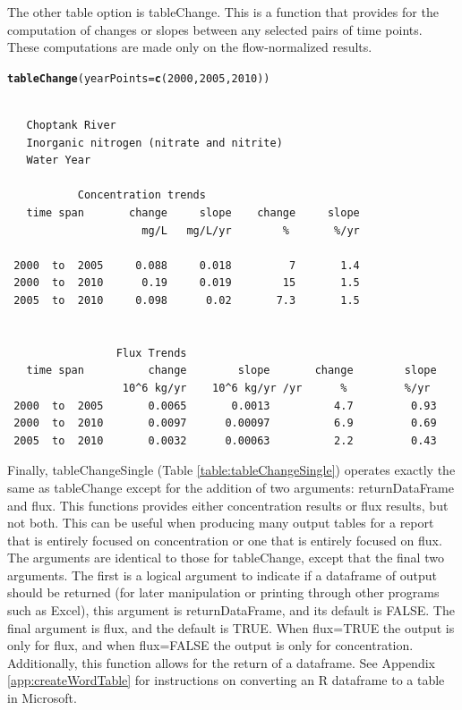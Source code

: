 \documentclass[a4paper,11pt]{article}\usepackage{graphicx, color}
\makeatletter
\newcommand{\hlfunctioncall}[1]{\textcolor[rgb]{0.501960784313725,0,0.329411764705882}{\textbf{#1}}}%
\newenvironment{kframe}{%
 \def\at@end@of@kframe{}%
 \ifinner\ifhmode%
  \def\at@end@of@kframe{\end{minipage}}%
  \begin{minipage}{\columnwidth}%
 \fi\fi%
 \def\FrameCommand##1{\hskip\@totalleftmargin \hskip-\fboxsep
 \colorbox{shadecolor}{##1}\hskip-\fboxsep
     \hskip-\linewidth \hskip-\@totalleftmargin \hskip\columnwidth}%
 \MakeFramed {\advance\hsize-\width
   \@totalleftmargin\z@ \linewidth\hsize
   \@setminipage}}%
 {\par\unskip\endMakeFramed%
 \at@end@of@kframe}
\newenvironment{knitrout}{}{} %
\makeatother
\begin{document}
The other table option is tableChange. This is a function that provides for the computation of changes or slopes between any selected pairs of time points.  These computations are made only on the flow-normalized results.

\begin{knitrout}
\color{fgcolor}\begin{kframe}
\begin{alltt}
\hlfunctioncall{tableChange}(yearPoints=\hlfunctioncall{c}(2000,2005,2010))
\end{alltt}
\begin{verbatim}

   Choptank River 
   Inorganic nitrogen (nitrate and nitrite)
   Water Year 

           Concentration trends
   time span       change     slope    change     slope
                     mg/L   mg/L/yr        %       %/yr

 2000  to  2005     0.088     0.018         7       1.4
 2000  to  2010      0.19     0.019        15       1.5
 2005  to  2010     0.098      0.02       7.3       1.5


                 Flux Trends
   time span          change        slope       change        slope
                  10^6 kg/yr    10^6 kg/yr /yr      %         %/yr
 2000  to  2005       0.0065       0.0013          4.7         0.93
 2000  to  2010       0.0097      0.00097          6.9         0.69
 2005  to  2010       0.0032      0.00063          2.2         0.43
\end{verbatim}
\end{kframe}
\end{knitrout}


Finally, tableChangeSingle (Table \ref{table:tableChangeSingle}) operates exactly the same as tableChange except for the addition of two arguments: returnDataFrame and flux. This functions provides either concentration results or flux results, but not both.  This can be useful when producing many output tables for a report that is entirely focused on concentration or one that is entirely focused on flux.  The arguments are identical to those for tableChange, except that the final two arguments.  The first is a logical argument to indicate if a dataframe of output should be returned (for later manipulation or printing through other programs such as Excel), this argument is returnDataFrame, and its default is FALSE.  The final argument is flux, and the default is TRUE.  When flux=TRUE the output is only for flux, and when flux=FALSE the output is only for concentration.  Additionally, this function allows for the return of a dataframe.  See Appendix \ref{app:createWordTable} for instructions on converting an R dataframe to a table in Microsoft.
\end{document}
